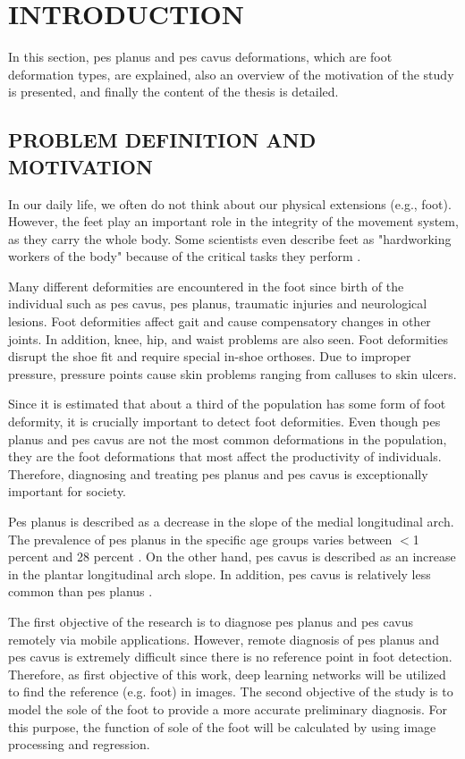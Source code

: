 \chapter{INTRODUCTION}

In this section, pes planus and pes cavus deformations, which are foot deformation types, are explained, also an overview of the motivation of the study is presented, and finally the content of the thesis is detailed.

\section{PROBLEM DEFINITION AND MOTIVATION}
In our daily life, we often do not think about our physical extensions (e.g., foot). However, the feet play an important role in the integrity of the movement system, as they carry the whole body. Some scientists even describe feet as "hardworking workers of the body" because of the critical tasks they perform \cite{veli2004shoes}.

Many different deformities are encountered in the foot since birth of the individual such as pes cavus, pes planus, traumatic injuries and neurological lesions. Foot deformities affect gait and cause compensatory changes in other joints. In addition, knee, hip, and waist problems are also seen. Foot deformities disrupt the shoe fit and require special in-shoe orthoses. Due to improper pressure, pressure points cause skin problems ranging from calluses to skin ulcers.

Since it is estimated that about a third of the population has some form of foot deformity, it is crucially important to detect foot deformities. Even though pes planus and pes cavus are not the most common deformations in the population, they are the foot deformations that most affect the productivity of individuals. Therefore, diagnosing and treating pes planus and pes cavus is exceptionally important for society.

Pes planus is described as a decrease in the slope of the medial longitudinal arch. The prevalence of pes planus in the specific age groups varies between $<$1 percent and 28 percent \cite{ccilli2009prevalence, pfeiffer2006prevalence, abdel2006flat, chen2009flatfoot}. On the other hand, pes cavus is described as an increase in the plantar longitudinal arch slope. In addition, pes cavus is relatively less common than pes planus \cite{kharbuja2017prevalence}.

The first objective of the research is to diagnose pes planus and pes cavus remotely via mobile applications. However, remote diagnosis of pes planus and pes cavus is extremely difficult since there is no reference point in foot detection. Therefore, as first objective of this work, deep learning networks will be utilized to find the reference (e.g. foot) in images. The second objective of the study is to model the sole of the foot to provide a more accurate preliminary diagnosis. For this purpose, the function of sole of the foot will be calculated by using image processing and regression.

